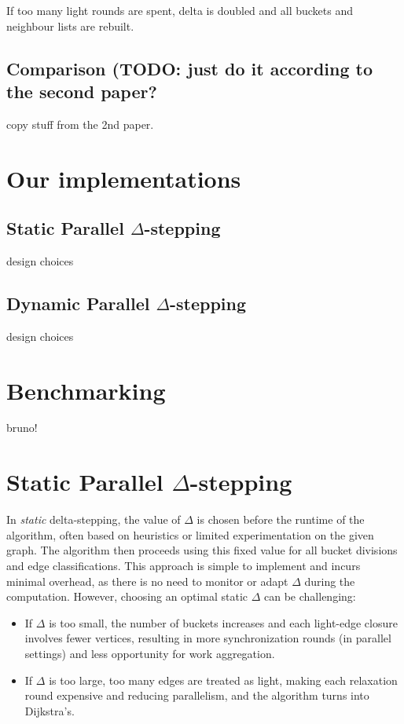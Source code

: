 \documentclass[12pt]{article}
\begin{document}
If too many light rounds are spent, delta is doubled and all buckets and neighbour lists are rebuilt.
\subsection{Comparison (TODO: just do it according to the second paper? }
 copy stuff from the 2nd paper.

\section{Our implementations}
\subsection{Static Parallel $\Delta$-stepping}
 design choices
\subsection{Dynamic Parallel $\Delta$-stepping}
 design choices
\section{Benchmarking}
bruno!

\section{Static Parallel $\Delta$-stepping}
In \emph{static} delta-stepping, the value of $\Delta$ is chosen before the runtime of the algorithm, often based on heuristics or limited experimentation on the given graph. The algorithm then proceeds using this fixed value for all bucket divisions and edge classifications. This approach is simple to implement and incurs minimal overhead, as there is no need to monitor or adapt $\Delta$ during the computation. However, choosing an optimal static $\Delta$ can be challenging:
\begin{itemize}
    \item If $\Delta$ is too small, the number of buckets increases and each light-edge closure involves fewer vertices, resulting in more synchronization rounds (in parallel settings) and less opportunity for work aggregation.
    \item If $\Delta$ is too large, too many edges are treated as light, making each relaxation round expensive and reducing parallelism, and the algorithm turns into Dijkstra's.
\end{itemize}
\end{document}
